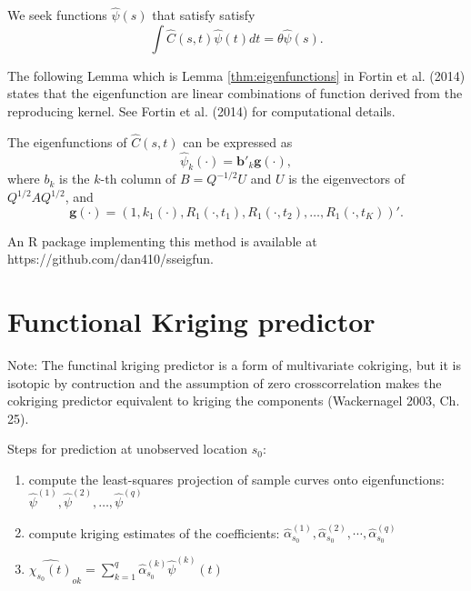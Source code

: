 We seek functions $\hat{\psi}(s)$ that satisfy satisfy 
\begin{equation}
	\label{eq:eigenfuns} \int \hat{C}(s,t)\hat{\psi}(t)dt=\theta\hat{\psi}(s). 
\end{equation}

The following Lemma which is Lemma \ref{thm:eigenfunctions} in Fortin et al. (2014) states that the eigenfunction are linear combinations of function derived from the reproducing kernel. See Fortin et al. (2014) for computational details.
\begin{lemma}
	\label{thm:eigenfunctions} The eigenfunctions of $\hat{C}(s,t)$ can be expressed as 
	\begin{equation*}
		\hat{\psi}_k(\cdot) = \mathbf{b}'_k\mathbf{g}(\cdot), 
	\end{equation*}
	where $b_k$ is the $k$-th column of $B=Q^{-1/2}U$ and $U$ is the eigenvectors of $Q^{1/2}AQ^{1/2}$, and
	\[ \mathbf{g(\cdot)}=(1, k_1(\cdot),R_{1}(\cdot, t_1),R_{1}(\cdot, t_2),\dots, R_{1}(\cdot, t_K))'. \]
\end{lemma}
An R package implementing this method is available at https://github.com/dan410/sseigfun.


\section{Functional Kriging predictor} 

\label{sec:functional_kriging_predictor}

Note: The functinal kriging predictor is a form of multivariate cokriging, but it is isotopic by contruction and the assumption of zero crosscorrelation makes the cokriging predictor equivalent to kriging the components (Wackernagel 2003, Ch. 25). 

Steps for prediction at unobserved location $s_0$: 
\begin{enumerate}
	\item compute the least-squares projection of sample curves onto eigenfunctions: $\hat{\psi}^{(1)}, \hat{\psi}^{(2)}, \dots, \hat{\psi}^{(q)}$ 
	\item compute kriging estimates of the coefficients: $\hat{\alpha}_{s_0}^{(1)}, \hat{\alpha}_{s_0}^{(2)}, \cdots, \hat{\alpha}_{s_0}^{(q)}$ 
	\item $\widehat{\chi_{s_0}(t)}_{ok} = \sum_{k=1}^{q} \hat{\alpha}_{s_0}^{(k)}\hat{\psi}^{(k)}(t)$ 
	
\end{enumerate}


